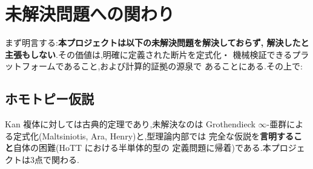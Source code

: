 \documentclass[11pt]{ltjsarticle}
\begin{document}
\section{未解決問題への関わり}\label{sec:open}

まず明言する:\textbf{本プロジェクトは以下の未解決問題を解決しておらず,
解決したと主張もしない}.その価値は,明確に定義された断片を定式化・
機械検証できるプラットフォームであること,および計算的証拠の源泉で
あることにある.その上で:

\subsection{ホモトピー仮説}
Kan 複体に対しては古典的定理であり,未解決なのは Grothendieck
$\infty$-亜群による定式化(Maltsiniotis, Ara, Henry)と,型理論内部では
完全な仮説を\textbf{言明すること}自体の困難(HoTT における半単体的型の
定義問題に帰着)である.本プロジェクトは3点で関わる.
\end{document}
